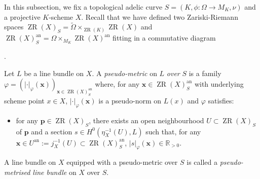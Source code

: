 \documentclass [11pt,reqno]{amsart}
\def\bR{{\mathbb{R}}}
\newcommand{\1}{\mathmybb{1}}
\def\an{\operatorname{an}}
\def\Spec{\operatorname{Spec}}
\def\ZR{\operatorname{ZR}}
\def\tilde{\widetilde}
\begin{document}
In this subsection, we fix a topological adelic curve $S=(K,\phi:\Omega\to M_K,\nu)$ and a projective $K$-scheme $X$. Recall that we have defined two Zariski-Riemann spaces $\ZR(X)_{S}=\tilde{\Omega}\times_{\ZR(K)}\ZR(X)$ and $\ZR(X)^{\an}_{S}=\Omega\times_{M_{K}}\ZR(X)^{\an}$ fitting in a commutative diagram 
\begin{center}
.
\end{center}

\begin{definition}
\label{def:pseudo-metric_family}
Let $L$ be a line bundle on $X$. A \emph{pseudo-metric} on $L$ \emph{over} $S$ is a family $\varphi=(|\cdot|_{\varphi}(\mathbf{x}))_{\mathbf{x}\in \ZR(X)^{\an}_{S}}$ where, for any $\mathbf{x}\in \ZR(X)_{S}^{\an}$ with underlying scheme point $x\in X$, $|\cdot|_{\varphi}(\mathbf{x})$ is a pseudo-norm on $L(x)$ and $\varphi$ satisfies:
\begin{itemize}
	\item[($\ast$)] for any $\mathbf{p}\in \ZR(X)_{S}$, there exists an open neighbourhood $U\subset \ZR(X)_{S}$ of $\mathbf{p}$ and a section $s\in H^{0}(\eta_{X}^{-1}(U),L)$ such that, for any $\mathbf{x}\in U^{\an}:=j_{X}^{-1}(U) \subset \ZR(X)_{S}^{\an}$, $|s|_{\varphi}(\mathbf{x})\in \bR_{>0}$.
	\end{itemize}
A line bundle on $X$ equipped with a pseudo-metric over $S$ is called a \emph{pseudo-metrised line bundle} on $X$ over $S$.
\end{definition}
\end{document}
